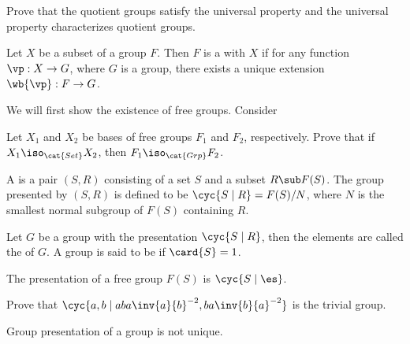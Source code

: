\documentclass[10pt]{article}
\begin{document}
\begin{center}
\end{center}
\begin{problem}
    Prove that the quotient groups satisfy the universal property and the universal property characterizes quotient groups.
\end{problem}
\begin{Universal property for free groups}
    Let $X$ be a subset of a group $F$. Then $F$ is a  with  $X$ if for any function $\vp:X\to G$, where $G$ is a group, there exists a unique extension $\wb{\vp}:F\to G$.
\end{Universal property for free groups}
\begin{center}
\end{center}
\par
We will first show the existence of free groups. Consider 

\begin{problem}
    Let ${X}_{1}$ and ${X}_{2}$ be bases of free groups ${F}_{1}$ and ${F}_{2}$, respectively. Prove that if ${X}_{1}{\iso}_{\cat{Set}}{X}_{2}$, then ${F}_{1}{\iso}_{\cat{Grp}}{F}_{2}$.
\end{problem}
\begin{definition}
    A  is a pair $(S,R)$ consisting of a set $S$ and a subset $R\sub F(S)$. The group presented by $(S,R)$ is defined to be $\cyc{S\mid R}=F(S)/N$, where $N$ is the smallest normal subgroup of $F(S)$ containing $R$.
\end{definition}
\begin{definition}
    Let $G$ be a group with the presentation $\cyc{S\mid R}$, then the elements are called the  of $G$. A group is said to be  if $\card{S}=1$.
\end{definition}
\begin{example}
    The presentation of a free group $F(S)$ is $\cyc{S\mid\es}$.
\end{example}
\begin{problem}
    Prove that $\cyc{a,b\mid aba\inv{a}{b}^{-2},ba\inv{b}{a}^{-2}}$ is the trivial group.
\end{problem}
\par
Group presentation of a group is not unique. 
\end{document}
